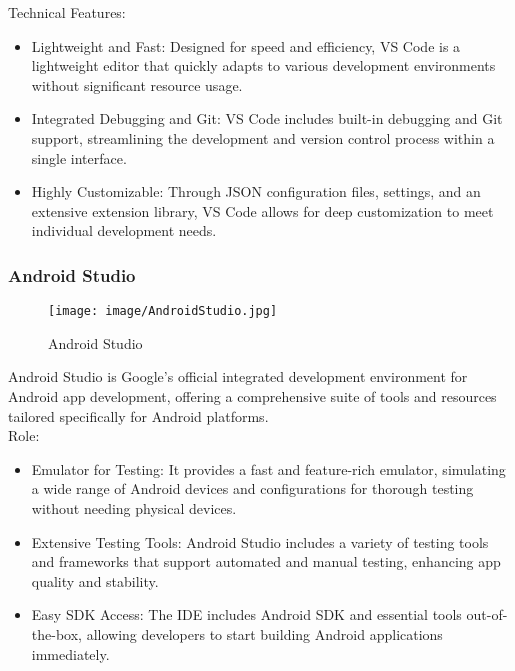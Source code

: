 \documentclass[conference]{IEEEtran}
\begin{document}
Technical Features:
\begin{itemize}
    \item Lightweight and Fast: Designed for speed and efficiency, VS Code is a lightweight editor that quickly adapts to various development environments without significant resource usage.\\
    \item Integrated Debugging and Git: VS Code includes built-in debugging and Git support, streamlining the development and version control process within a single interface.\\
    \item Highly Customizable: Through JSON configuration files, settings, and an extensive extension library, VS Code allows for deep customization to meet individual development needs.\\
\end{itemize}


\subsubsection{Android Studio}

\begin{figure}[h!]
    \centering
    \texttt{[image: image/AndroidStudio.jpg]}
    \caption{Android Studio}
    \label{fig:enter-label}
\end{figure}

\noindent Android Studio is Google’s official integrated development environment for Android app development, offering a comprehensive suite of tools and resources tailored specifically for Android platforms.\\

Role:
\begin{itemize}
    \item Emulator for Testing: It provides a fast and feature-rich emulator, simulating a wide range of Android devices and configurations for thorough testing without needing physical devices.\\
    \item Extensive Testing Tools: Android Studio includes a variety of testing tools and frameworks that support automated and manual testing, enhancing app quality and stability.\\
    \item Easy SDK Access: The IDE includes Android SDK and essential tools out-of-the-box, allowing developers to start building Android applications immediately.
\end{itemize}
\end{document}
